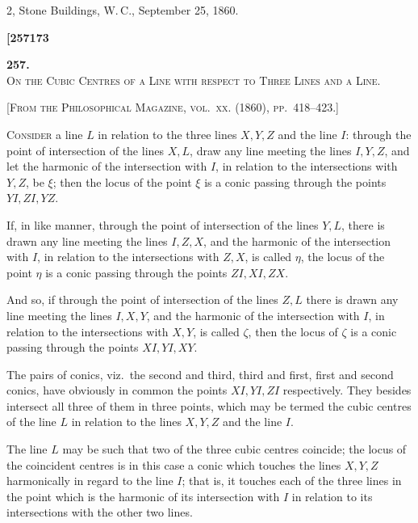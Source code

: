 \documentclass[11pt]{article}
\begin{document}
\medskip

\hfill 2, Stone Buildings, W.\,C., September 25, 1860.

\newpage


\noindent\textbf{[257}\hfill\hfill\textbf{173}

\medskip

\begin{center}
\textbf{257.}\\[0.6em]
{\Large\textsc{On the Cubic Centres of a Line with respect to Three Lines and a Line.}}
\end{center}

\medskip

\textsc{[From the Philosophical Magazine, vol.~xx. (1860), pp.~418--423.]}

\medskip

\textsc{Consider} a line $L$ in relation to the three lines $X, Y, Z$ and the line $I$: through the point of intersection of the lines $X, L$, draw any line meeting the lines $I, Y, Z$, and let the harmonic of the intersection with $I$, in relation to the intersections with $Y, Z$, be $\xi$; then the locus of the point $\xi$ is a conic passing through the points $YI, ZI, YZ$.

If, in like manner, through the point of intersection of the lines $Y, L$, there is drawn any line meeting the lines $I, Z, X$, and the harmonic of the intersection with $I$, in relation to the intersections with $Z, X$, is called $\eta$, the locus of the point $\eta$ is a conic passing through the points $ZI, XI, ZX$.

And so, if through the point of intersection of the lines $Z, L$ there is drawn any line meeting the lines $I, X, Y$, and the harmonic of the intersection with $I$, in relation to the intersections with $X, Y$, is called $\zeta$, then the locus of $\zeta$ is a conic passing through the points $XI, YI, XY$.

The pairs of conics, viz.\ the second and third, third and first, first and second conics, have obviously in common the points $XI, YI, ZI$ respectively. They besides intersect all three of them in three points, which may be termed the cubic centres of the line $L$ in relation to the lines $X, Y, Z$ and the line $I$.

The line $L$ may be such that two of the three cubic centres coincide; the locus of the coincident centres is in this case a conic which touches the lines $X, Y, Z$ harmonically in regard to the line $I$; that is, it touches each of the three lines in the point which is the harmonic of its intersection with $I$ in relation to its intersections with the other two lines.
\end{document}
